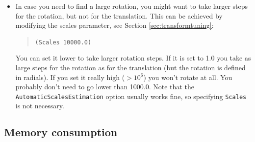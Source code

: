 \documentclass[]{report}
\begin{document}
\begin{itemize}
\item In case you need to find a large rotation, you might want to
take larger steps for the rotation, but not for the translation.
This can be achieved by modifying the scales parameter, see
Section \ref{sec:transformtuning}:
\begin{quote}
\texttt{(Scales 10000.0)}
\end{quote}
You can set it lower to take larger rotation steps. If it is set
to 1.0 you take as large steps for the rotation as for the
translation (but the rotation is defined in radials). If you set
it really high ($> 10^6$) you won't rotate at all. You probably
don't need to go lower than 1000.0. Note that the
\texttt{AutomaticScalesEstimation} option usually works fine, so
specifying \texttt{Scales} is not necessary.

\end{itemize}

\subsection{Memory consumption}\label{ssec:tut:memory}
\end{document}

